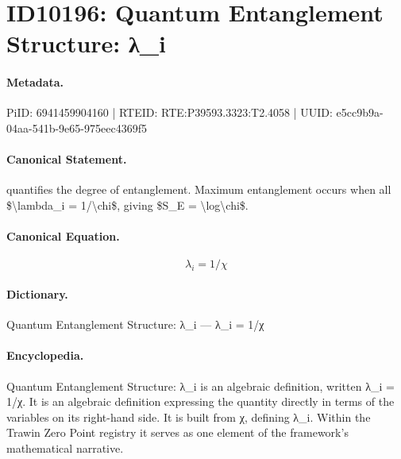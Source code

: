\section*{ID10196: Quantum Entanglement Structure: λ\_i}
\paragraph{Metadata.}
PiID: 6941459904160 | RTEID: RTE:P39593.3323:T2.4058 | UUID: e5cc9b9a-04aa-541b-9e65-975eec4369f5

\paragraph{Canonical Statement.}
quantifies the degree of entanglement. Maximum entanglement occurs when all \$\textbackslash{}lambda\_i = 1/\textbackslash{}chi\$, giving \$S\_E = \textbackslash{}log\textbackslash{}chi\$.

\paragraph{Canonical Equation.}
\[
\lambda_i = 1/\chi
\]

\paragraph{Dictionary.}
Quantum Entanglement Structure: λ\_i — λ\_i = 1/χ

\paragraph{Encyclopedia.}
Quantum Entanglement Structure: λ\_i is an algebraic definition, written λ\_i = 1/χ. It is an algebraic definition expressing the quantity directly in terms of the variables on its right-hand side. It is built from χ, defining λ\_i. Within the Trawin Zero Point registry it serves as one element of the framework's mathematical narrative.
